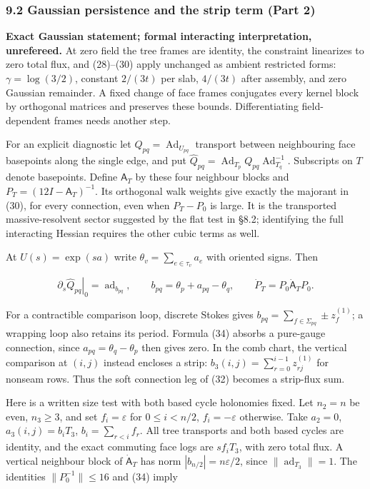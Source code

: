 \documentclass[11pt,a4paper]{article}
\begin{document}
\hypertarget{gaussian-persistence-and-the-strip-term-part-2}{%
\subsubsection{9.2 Gaussian persistence and the strip term (Part
2)}\label{gaussian-persistence-and-the-strip-term-part-2}}

\textbf{Exact Gaussian statement; formal interacting interpretation,
unrefereed.} At zero field the tree frames are identity, the constraint
linearizes to zero total flux, and (28)--(30) apply unchanged as ambient
restricted forms: \(\gamma=\log(3/2)\), constant \(2/(3t)\) per slab,
\(4/(3t)\) after assembly, and zero Gaussian remainder. A fixed change
of face frames conjugates every kernel block by orthogonal matrices and
preserves these bounds. Differentiating field-dependent frames needs
another step.

For an explicit diagnostic let \(Q_{pq}=\operatorname{Ad}_{U_{pq}}\)
transport between neighbouring face basepoints along the single edge,
and put
\(\widehat Q_{pq}=\operatorname{Ad}_{T_p}Q_{pq} \operatorname{Ad}_{T_q}^{-1}\).
Subscripts on \(T\) denote basepoints. Define \(\mathsf A_T\) by these
four neighbour blocks and \(P_T=(12I-\mathsf A_T)^{-1}\). Its orthogonal
walk weights give exactly the majorant in (30), for every connection,
even when \(P_T-P_0\) is large. It is the transported massive-resolvent
sector suggested by the flat test in §8.2; identifying the full
interacting Hessian requires the other cubic terms as well.

At \(U(s)=\exp(sa)\) write \(\theta_v=\sum_{e\in\tau_v}a_e\) with
oriented signs. Then

\[\left.\partial_s\widehat Q_{pq}\right|_0
=\operatorname{ad}_{b_{pq}},\qquad
b_{pq}=\theta_p+a_{pq}-\theta_q,
\qquad \dot P_T=P_0\dot{\mathsf A}_T P_0.\tag{34}\]

For a contractible comparison loop, discrete Stokes gives
\(b_{pq}=\sum_{f\in\Sigma_{pq}}\pm z_f^{(1)}\); a wrapping loop also
retains its period. Formula (34) absorbs a pure-gauge connection, since
\(a_{pq}=\theta_q-\theta_p\) then gives zero. In the comb chart, the
vertical comparison at \((i,j)\) instead encloses a strip:
\(b_3(i,j)=\sum_{r=0}^{i-1}z_{rj}^{(1)}\) for nonseam rows. Thus the
soft connection leg of (32) becomes a strip-flux sum.

Here is a written size test with both based cycle holonomies fixed. Let
\(n_2=n\) be even, \(n_3\ge3\), and set \(f_i=\varepsilon\) for
\(0\le i<n/2\), \(f_i=-\varepsilon\) otherwise. Take \(a_2=0\),
\(a_3(i,j)=b_iT_3\), \(b_i=\sum_{r<i}f_r\). All tree transports and both
based cycles are identity, and the exact commuting face logs are
\(sf_iT_3\), with zero total flux. A vertical neighbour block of
\(\dot{\mathsf A}_T\) has norm \(|b_{n/2}|=n\varepsilon/2\), since
\(\|\operatorname{ad}_{T_3}\|=1\). The identities \(\|P_0^{-1}\|\le16\)
and (34) imply
\end{document}
